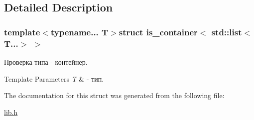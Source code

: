 \subsection{Detailed Description}
\subsubsection*{template$<$typename... T$>$struct is\-\_\-container$<$ std\-::list$<$ T...$>$ $>$}

Проверка типа -\/ контейнер. 


\begin{DoxyTemplParams}{Template Parameters}
{\em T} & -\/ тип. \\
\hline
\end{DoxyTemplParams}


The documentation for this struct was generated from the following file\-:\begin{DoxyCompactItemize}
\item 
\hyperlink{lib_8h}{lib.\-h}\end{DoxyCompactItemize}
